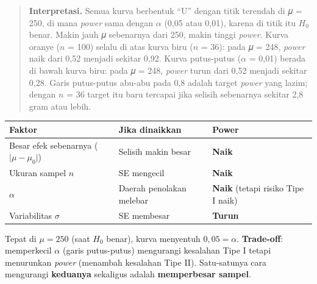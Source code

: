 \documentclass[
  indonesian,
  letterpaper,
]{book}
\newcounter{none} %
\begin{document}
\begin{quote}
\textbf{Interpretasi.} Semua kurva berbentuk ``U'' dengan titik terendah
di 𝜇 = 250, di mana \emph{power} sama dengan \(\alpha\) (0,05 atau
0,01), karena di titik itu \(H_0\) benar. Makin jauh 𝜇 sebenarnya dari
250, makin tinggi \emph{power}. Kurva oranye (\(n\) = 100) selalu di
atas kurva biru (\(n\) = 36): pada 𝜇 = 248, \emph{power} naik dari 0,52
menjadi sekitar 0,92. Kurva putus-putus (\(\alpha\) = 0,01) berada di
bawah kurva biru: pada 𝜇 = 248, \emph{power} turun dari 0,52 menjadi
sekitar 0,28. Garis putus-putus abu-abu pada 0,8 adalah target
\emph{power} yang lazim; dengan \(n\) = 36 target itu baru tercapai jika
selisih sebenarnya sekitar 2,8 gram atau lebih.
\end{quote}

{\def\LTcaptype{none} %
\begin{longtable}[]{@{}
  >{\raggedright\arraybackslash}p{}
  >{\raggedright\arraybackslash}p{}
  >{\raggedright\arraybackslash}p{}@{}}
\toprule\noalign{}
\begin{minipage}[b]{\linewidth}\raggedright
Faktor
\end{minipage} & \begin{minipage}[b]{\linewidth}\raggedright
Jika dinaikkan
\end{minipage} & \begin{minipage}[b]{\linewidth}\raggedright
Power
\end{minipage} \\
\midrule\noalign{}
\endhead
\bottomrule\noalign{}
\endlastfoot
Besar efek sebenarnya (\(\lvert\mu - \mu_0\rvert\)) & Selisih makin
besar & \textbf{Naik} \\
Ukuran sampel \(n\) & SE mengecil & \textbf{Naik} \\
\(\alpha\) & Daerah penolakan melebar & \textbf{Naik} (tetapi risiko
Tipe I naik) \\
Variabilitas \(\sigma\) & SE membesar & \textbf{Turun} \\
\end{longtable}
}

Tepat di \(\mu = 250\) (saat \(H_0\) benar), kurva menyentuh
\(0{,}05 = \alpha\). \textbf{Trade-off}: memperkecil \(\alpha\) (garis
putus-putus) mengurangi kesalahan Tipe I tetapi menurunkan \emph{power}
(menambah kesalahan Tipe II). Satu-satunya cara mengurangi
\textbf{keduanya} sekaligus adalah \textbf{memperbesar sampel}.
\end{document}
